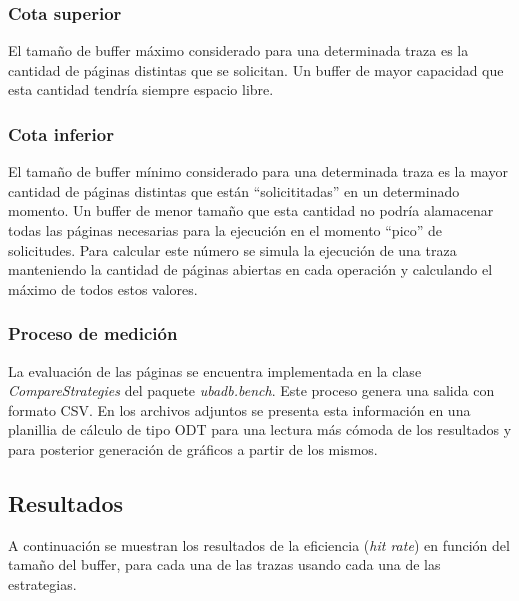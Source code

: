 \subsubsection*{Cota superior}
El tama\~no de buffer m\'aximo considerado para una determinada traza es la cantidad de p\'aginas distintas que se solicitan. Un buffer
de mayor capacidad que esta cantidad tendr\'ia siempre espacio libre.  

\subsubsection*{Cota inferior}
El tama\~no de buffer m\'inimo considerado para una determinada traza es la mayor cantidad de p\'aginas distintas que est\'an ``solicititadas''
en un determinado momento. Un buffer de menor tama\~no que esta cantidad no podr\'ia alamacenar todas las p\'aginas necesarias para la ejecuci\'on 
en el momento ``pico'' de solicitudes. Para calcular este n\'umero se simula la ejecuci\'on de una traza manteniendo la cantidad de p\'aginas abiertas
en cada operaci\'on y calculando el m\'aximo de todos estos valores. 

\subsubsection{Proceso de medici\'on}
La evaluaci\'on de las p\'aginas se encuentra implementada en la clase \textit{CompareStrategies} del paquete \textit{ubadb.bench}. 
Este proceso genera una salida con formato CSV. En los archivos adjuntos se presenta esta informaci\'on en una planillia de 
c\'alculo de tipo ODT para una lectura m\'as c\'omoda de los resultados y para posterior generaci\'on de gr\'aficos a partir de 
los mismos.

\subsection{Resultados}
A continuaci\'on se muestran los resultados de la eficiencia (\textit{hit rate}) en funci\'on del tama\~no del buffer, para cada una de las trazas usando cada una de las
estrategias.
